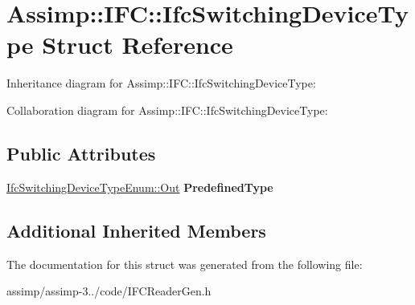 \hypertarget{struct_assimp_1_1_i_f_c_1_1_ifc_switching_device_type}{\section{Assimp\+:\+:I\+F\+C\+:\+:Ifc\+Switching\+Device\+Type Struct Reference}
\label{struct_assimp_1_1_i_f_c_1_1_ifc_switching_device_type}
}


Inheritance diagram for Assimp\+:\+:I\+F\+C\+:\+:Ifc\+Switching\+Device\+Type\+:


Collaboration diagram for Assimp\+:\+:I\+F\+C\+:\+:Ifc\+Switching\+Device\+Type\+:
\subsection*{Public Attributes}
\begin{DoxyCompactItemize}
\item 
\hypertarget{struct_assimp_1_1_i_f_c_1_1_ifc_switching_device_type_a31f52980f0c18866d6168be179cac14e}{\hyperlink{classboost_1_1shared__ptr}{Ifc\+Switching\+Device\+Type\+Enum\+::\+Out} {\bfseries Predefined\+Type}}\label{struct_assimp_1_1_i_f_c_1_1_ifc_switching_device_type_a31f52980f0c18866d6168be179cac14e}

\end{DoxyCompactItemize}
\subsection*{Additional Inherited Members}


The documentation for this struct was generated from the following file\+:\begin{DoxyCompactItemize}
\item 
assimp/assimp-\/3../code/I\+F\+C\+Reader\+Gen.\+h\end{DoxyCompactItemize}

